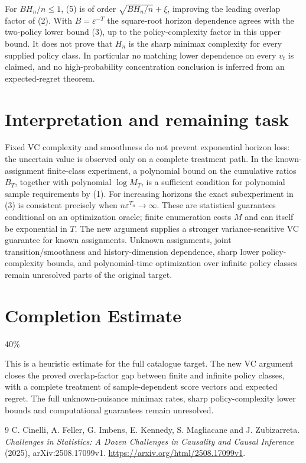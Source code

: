 \documentclass[11pt]{article}
\theoremstyle{definition}
\begin{document}
For $B H_n/n\le1$, (5) is of order
$\sqrt{B H_n/n}+\xi$, improving the leading overlap factor of (2).
With $B=\varepsilon^{-T}$ the square-root horizon dependence agrees
with the two-policy lower bound (3), up to the policy-complexity factor
in this upper bound. It does not prove that $H_n$ is the sharp minimax
complexity for every supplied policy class. In particular no matching
lower dependence on every $v_t$ is claimed, and no high-probability
concentration conclusion is inferred from an expected-regret theorem.

\section*{Interpretation and remaining task}
Fixed VC complexity and smoothness do not prevent exponential horizon
loss: the uncertain value is observed only on a complete treatment path.
In the known-assignment finite-class experiment, a polynomial bound on
the cumulative ratios $B_T$, together with polynomial $\log M_T$,
is a sufficient condition for polynomial sample requirements by (1).
For increasing horizons the exact subexperiment in (3) is consistent
precisely when $n\varepsilon^{T_n}\to\infty$.
These are statistical guarantees conditional on an optimization oracle;
finite enumeration costs $M$ and can itself be exponential in $T$.
The new argument supplies a stronger variance-sensitive VC guarantee for
known assignments. Unknown assignments, joint transition/smoothness and
history-dimension dependence, sharp lower policy-complexity bounds, and
polynomial-time optimization over infinite policy classes remain unresolved
parts of the original target.

\section{Completion Estimate}
40\%

This is a heuristic estimate for the full catalogue target. The new VC argument closes the proved overlap-factor gap between finite and infinite policy classes, with a complete treatment of sample-dependent score vectors and expected regret. The full unknown-nuisance minimax rates, sharp policy-complexity lower bounds and computational guarantees remain unresolved.

\begin{thebibliography}{9}
 C. Cinelli, A. Feller, G. Imbens, E. Kennedy, S. Magliacane and J. Zubizarreta.
\emph{Challenges in Statistics: A Dozen Challenges in Causality and Causal Inference} (2025), arXiv:2508.17099v1.
\url{https://arxiv.org/html/2508.17099v1}.
\end{thebibliography}
\end{document}
